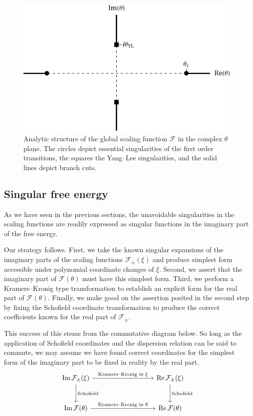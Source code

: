 \documentclass[
  aps,
  pre,
  reprint,
  longbibliography,
  floatfix
]{revtex4-2}
\begin{document}
\begin{figure}
  \includegraphics{figs/F_theta_singularities.pdf}
  \caption{
    Analytic structure of the global scaling function $\mathcal F$ in the
    complex $\theta$ plane. The circles depict essential singularities of the
    first order transitions, the squares the Yang--Lee singularities, and the
    solid lines depict branch cuts.
  } \label{fig:schofield.singularities}
\end{figure}

\subsection{Singular free energy}

As we have seen in the previous sections, the unavoidable singularities in the
scaling functions are readily expressed as singular functions in the imaginary
part of the free energy.

Our strategy follows. First, we take the known singular expansions of the imaginary parts of the scaling functions $\mathcal F_{\pm}(\xi)$ and produce simplest form accessible under polynomial coordinate changes of $\xi$. Second, we assert that the imaginary part of $\mathcal F(\theta)$ must have this simplest form. Third, we perform a Kramers--Kronig type transformation to establish an explicit form for the real part of $\mathcal F(\theta)$. Finally, we make good on the assertion posited in the second step by fixing the Schofield coordinate transformation to produce the correct coefficients known for the real part of $\mathcal F_{\pm}$.

This success of this stems from the commutative diagram below. So long as the
application of Schofield coordinates and the dispersion relation can be said to
commute, we may assume we have found correct coordinates for the simplest form
of the imaginary part to be fixed in reality by the real part.
\[
  \begin{tikzcd}[row sep=large, column sep = 9em]
  \operatorname{Im}\mathcal F_\pm(\xi) \arrow{r}{\text{Kramers--Kronig in $\xi$}} \arrow[]{d}{\text{Schofield}} & \operatorname{Re}\mathcal F_{\pm}(\xi) \arrow{d}{\text{Schofield}} \\%
  \operatorname{Im}\mathcal F(\theta) \arrow{r}{\text{Kramers--Kronig in $\theta$}}& \operatorname{Re}\mathcal F(\theta)
\end{tikzcd}
\]
\end{document}

